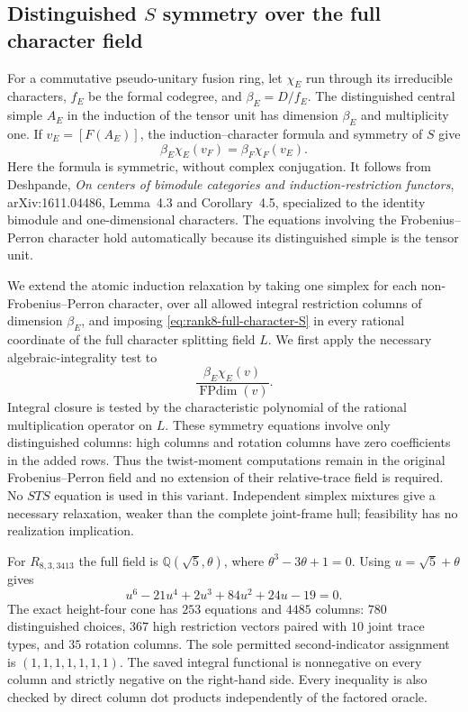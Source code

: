 \subsection{Distinguished $S$ symmetry over the full character field}
\label{sec:rank8-full-character-S}
For a commutative pseudo-unitary fusion ring, let $\chi_E$ run through its
irreducible characters, $f_E$ be the formal codegree, and
$\beta_E=D/f_E$. The distinguished central simple $A_E$ in the induction
of the tensor unit has dimension $\beta_E$ and multiplicity one. If
$v_E=[F(A_E)]$, the induction--character formula and symmetry of $S$ give
\begin{equation}\label{eq:rank8-full-character-S}
 \beta_E\chi_E(v_F)=\beta_F\chi_F(v_E).
\end{equation}
Here the formula is symmetric, without complex conjugation. It follows
from Deshpande, \emph{On centers of bimodule categories and
induction-restriction functors}, arXiv:1611.04486, Lemma~4.3 and
Corollary~4.5, specialized to the identity bimodule and one-dimensional
characters. The equations involving the Frobenius--Perron character
hold automatically because its distinguished simple is the tensor unit.

We extend the atomic induction relaxation by taking one simplex for
each non-Frobenius--Perron character, over all allowed integral
restriction columns of dimension $\beta_E$, and imposing
\eqref{eq:rank8-full-character-S} in every rational coordinate of the
full character splitting field $L$. We first apply the necessary
algebraic-integrality test to
\[
 \frac{\beta_E\chi_E(v)}{\operatorname{FPdim}(v)}.
\]
Integral closure is tested by the characteristic polynomial of the
rational multiplication operator on $L$. These symmetry equations
involve only distinguished columns: high columns and rotation columns
have zero coefficients in the added rows. Thus the twist-moment
computations remain in the original Frobenius--Perron field and no
extension of their relative-trace field is required. No $STS$ equation
is used in this variant. Independent simplex mixtures give a necessary
relaxation, weaker than the complete joint-frame hull; feasibility has
no realization implication.

For $R_{8,3,3413}$ the full field is
$\mathbb Q(\sqrt5,\theta)$, where $\theta^3-3\theta+1=0$.
Using $u=\sqrt5+\theta$ gives
\[
 u^6-21u^4+2u^3+84u^2+24u-19=0.
\]
The exact height-four cone has $253$ equations and $4485$ columns:
$780$ distinguished choices, $367$ high restriction vectors paired with
$10$ joint trace types, and $35$ rotation columns. The sole permitted
second-indicator assignment is $(1,1,1,1,1,1,1)$. The saved integral
functional is nonnegative on every column and strictly negative on
the right-hand side. Every inequality is also checked by direct column
dot products independently of the factored oracle.

